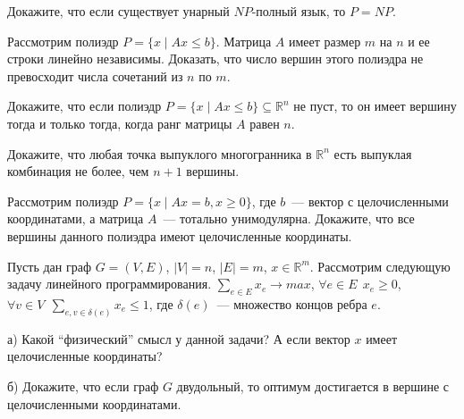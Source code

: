 \begin{ptask}{24}
	Докажите, что если существует унарный $NP$-полный язык, то $P = NP$.    
\end{ptask}

\begin{ptask}{25}
	Рассмотрим полиэдр $P = \{x \mid Ax \le b \}$. Матрица $A$ имеет размер
    $m$ на $n$ и ее строки линейно независимы. Доказать, что число вершин этого
    полиэдра не превосходит числа сочетаний из $n$ по $m$.    
\end{ptask}

\begin{ptask}{26}
   Докажите, что если полиэдр $P = \{x \mid Ax \le b\} \subseteq \mathbb{R}^n$ не пуст, то
   он имеет вершину тогда и только тогда, когда ранг матрицы $A$ равен $n$.
\end{ptask}

\begin{ptask}{27}
    Докажите, что любая точка выпуклого многогранника в $\mathbb{R}^n$ есть выпуклая
    комбинация не более, чем $n + 1$ вершины.
\end{ptask}

\begin{ptask}{29}
    Рассмотрим полиэдр $P = \{x \mid Ax = b, x \ge 0\}$, где $b$~--- вектор с
    целочисленными координатами, а матрица $A$~--- тотально унимодулярна. Докажите,
    что все вершины данного полиэдра имеют целочисленные координаты.
\end{ptask}


\begin{ptask}{30}
    Пусть дан граф $G = (V, E)$, $|V| = n$, $|E| = m$, $x \in
    \mathbb{R}^m$. Рассмотрим следующую задачу линейного программирования.
    $\sum_{e \in E} x_e \rightarrow max$, $\forall e \in E ~~ x_e \ge 0$,
    $\forall v \in V ~~ \sum_{e, v \in \delta(e)} x_e \le 1$, где $\delta(e)$~---
    множество концов ребра $e$.

    а) Какой ``физический'' смысл у данной задачи? А если вектор $x$ имеет
    целочисленные координаты?

    б) Докажите, что если граф $G$ двудольный, то оптимум достигается в вершине с
    целочисленными координатами.
\end{ptask}